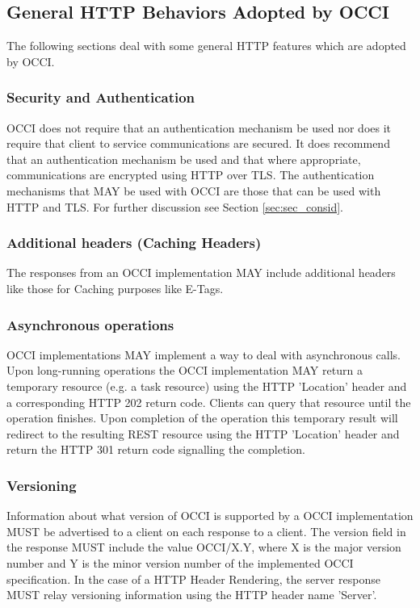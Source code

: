 \documentclass[10pt,a4paper]{article}
\begin{document}
\subsection{General HTTP Behaviors Adopted by OCCI}
The following sections deal with some general HTTP features which are
adopted by OCCI.

\subsubsection{Security and Authentication}
OCCI does not require that an authentication mechanism be used nor
does it require that client to service communications are secured. It
does recommend that an authentication mechanism be used and that where
appropriate, communications are encrypted using HTTP over TLS. The
authentication mechanisms that MAY be used with OCCI are those that
can be used with HTTP and TLS. For further discussion see Section 
\ref{sec:sec_consid}.

\subsubsection{Additional headers (Caching Headers)}
The responses from an OCCI implementation MAY include additional
headers like those for Caching purposes like E-Tags.

\subsubsection{Asynchronous operations}
OCCI implementations MAY implement a way to deal with asynchronous
calls. Upon long-running operations the OCCI implementation MAY return
a temporary resource (e.g. a task resource) using the HTTP 'Location'
header and a corresponding HTTP 202 return code. Clients can query
that resource until the operation finishes. Upon completion of the
operation this temporary result will redirect to the resulting REST
resource using the HTTP 'Location' header and return the HTTP 301
return code signalling the completion.

\subsubsection{Versioning}
Information about what version of OCCI is supported by a OCCI
implementation MUST be advertised to a client on each response to a
client. The version field in the response MUST include the value
OCCI/X.Y, where X is the major version number and Y is the minor
version number of the implemented OCCI specification. In the case of a
HTTP Header Rendering, the server response MUST relay versioning
information using the HTTP header name 'Server'.
\end{document}
